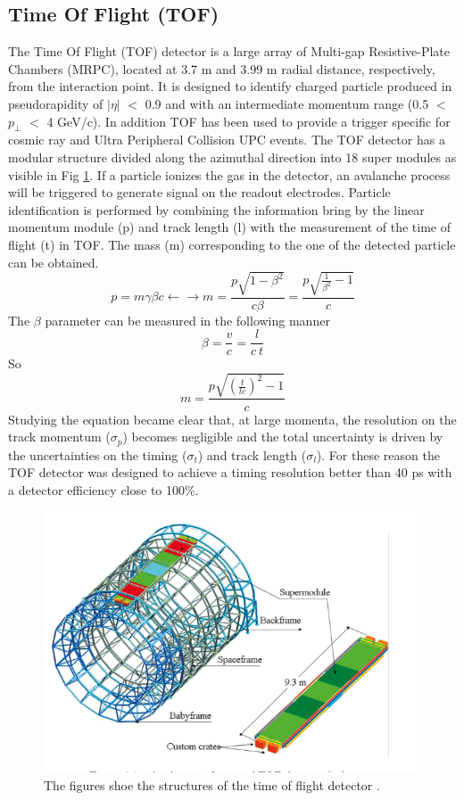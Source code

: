 \documentclass[12pt,a4paper]{book}
\begin{document}
	\cite{Padhan:2924203} \cite{amsdottorato9036} \cite{Cheng:2908766} \cite{Arata:2922803}
	
	\subsection{Time Of Flight (TOF)}
	The Time Of Flight (TOF) detector is a large array of Multi-gap Resistive-Plate Chambers (MRPC), located at 3.7 m and 3.99 m radial distance, respectively, from the interaction point. It is designed to identify charged particle produced in pseudorapidity of $|\eta|$ $<$ 0.9 and with an intermediate momentum range (0.5 $<$ $p_\perp$ $<$ 4 GeV/c). In addition TOF has been used to provide a trigger specific for cosmic ray and Ultra Peripheral Collision UPC events. The TOF detector has a modular structure divided along the azimuthal direction into 18 super modules as visible in Fig \ref{fig:TOF}. If a particle ionizes the gas in the detector, an avalanche process will be triggered to generate signal on the readout electrodes. Particle identification is performed by combining the information bring by the linear momentum module (p) and track length (l) with the measurement of the time of flight (t) in TOF. The mass (m) corresponding to the one of the detected particle can be obtained. 
	\begin{equation}
		p = m \gamma \beta c \leftarrow \rightarrow m = \frac{p \sqrt{1- \beta^2}}{c \beta} = \frac{p \sqrt{\frac{1}{\beta^2}-1}}{c}
	\end{equation} 
	The $\beta$ parameter can be measured in the following manner
	\begin{equation}
		\beta = \frac{v}{c}=\frac{l}{c \ t}
	\end{equation}
	So 
	\begin{equation}
		m = \frac{p \sqrt{\left( \frac{t}{l c} \right)^2-1}}{c}
	\end{equation}
	Studying the equation became clear that, at large momenta, the resolution on the track momentum ($\sigma_p$) becomes negligible and the total uncertainty is driven by the uncertainties on the timing ($\sigma_t$) and track length ($\sigma_l$). For these reason the TOF detector was designed to achieve a timing resolution better than 40 ps with a detector efficiency close to 100\%.
	\begin{figure}
		\centering
		\includegraphics[width=0.5\linewidth]{pictures/TOF.png}
		\caption{The figures shoe the structures of the time of flight detector \cite{ALICE:2014sbxFs}.}
		\label{fig:TOF}
	\end{figure}
	\cite{Padhan:2924203} \cite{amsdottorato9036} \cite{Cheng:2908766}
	\FloatBarrier
	
\end{document}
